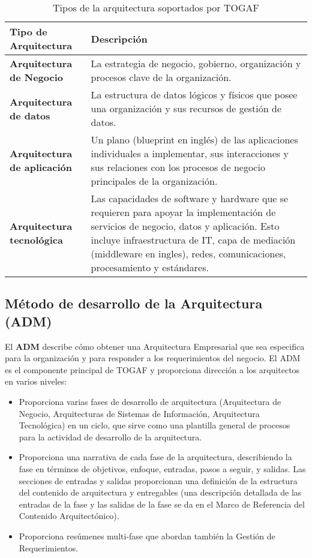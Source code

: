     \begin{table}[H]
    	\centering
    	\begin{tabular}{p{5cm}p{8cm}}
    		\hline
    		\rowcolor[HTML]{0073a1}
    		{\color[HTML]{FFFFFF} \textbf{Tipo de Arquitectura}} & {\color[HTML]{FFFFFF} \textbf{Descripción}} \\
    		\hline
    		\textbf{Arquitectura de Negocio\index{Negocio}} & La estrategia de negocio, gobierno, organización y procesos clave de la organización. \\
    		\textbf{Arquitectura de datos} & La estructura de datos lógicos y físicos que posee una organización y sus recursos de gestión de datos. \\
    		\textbf{Arquitectura de aplicación} & Un plano (blueprint en inglés) de las aplicaciones individuales a implementar, sus interacciones y sus relaciones con los procesos de negocio principales de la organización.
    		 \\
    		\textbf{Arquitectura tecnológica} & Las capacidades de software y hardware que se requieren para apoyar la implementación de servicios de negocio, datos y aplicación. Esto incluye infraestructura de IT, capa de mediación (middleware en ingles), redes, comunicaciones, procesamiento y estándares.
    		\\
    		\bottomrule
    	\end{tabular}
    	\captionsetup{width=.95\textwidth}
    	\caption{Tipos de la arquitectura soportados por TOGAF \cite{ref4}}
    	\label{tabla1} 
    \end{table}
    
  \subsection{Método de desarrollo de la Arquitectura (ADM)}
  El \textbf{ADM} describe cómo obtener una Arquitectura Empresarial que sea especifica para la organización y para responder a los requerimientos del negocio. El ADM es el componente principal de TOGAF y proporciona dirección a los arquitectos en varios niveles:
  \begin{itemize}
  	\item Proporciona varias fases de desarrollo de arquitectura (Arquitectura de Negocio, Arquitecturas de Sistemas de Información, Arquitectura Tecnológica) en un ciclo, que sirve como una plantilla general de procesos para la actividad de desarrollo de la arquitectura.
  	\item Proporciona una narrativa de cada fase de la arquitectura, describiendo la fase en términos de objetivos, enfoque, entradas, pasos a seguir, y salidas. Las secciones de entradas y salidas proporcionan una definición de la estructura del contenido de arquitectura y entregables (una descripción detallada de las entradas de la fase y las salidas de la fase se da en el Marco de Referencia del Contenido Arquitectónico).
  	\item Proporciona resúmenes multi-fase que abordan también la Gestión de Requerimientos.
  \end{itemize}
  
